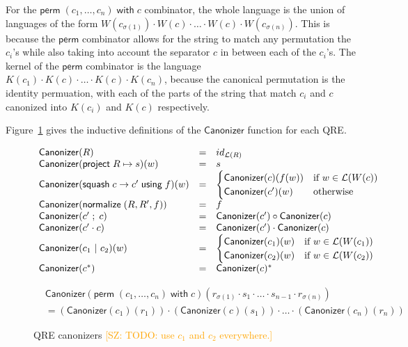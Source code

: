 \documentclass[acmsmall,review,anonymous]{acmart}
\newcommand{\FINISH}[3]{\ifdraft\textcolor{#1}{[#2: #3]}\fi}
\newcommand{\saz}[1]{\FINISH{orange}{SZ}{#1}}
\newcommand{\kw}[1]{\ensuremath{\mathsf{#1}}}
\newcommand{\project}[2]{\ensuremath{\kw{project} \; #1 \mapsto #2}}
\newcommand{\squash}[3]{\ensuremath{\kw{squash} \; #1 \rightarrow #2\; \kw{using} \; #3}}
\newcommand{\perm}[2]{\ensuremath{\kw{perm}\; (#1)\; \kw{with}\; #2}}
\newcommand{\normalize}[3]{\ensuremath{\kw{normalize} \; (#1, #2, #3)}}
\newcommand{\sep}{\ensuremath{\ | \ }}
\newcommand{\canonizer}{\ensuremath{\kw{Canonizer}}}
\begin{document}
For the $\perm{c_1, \ldots, c_n}{c}$ combinator, the whole language is the
union of languages of the form $W(c_{\sigma(1)}) \cdot W(c) \cdot \ldots \cdot
W(c) \cdot W(c_{\sigma(n)})$. This is because the \kw{perm}
combinator allows for the string to match any permutation the $c_i$'s while also
taking into account the separator $c$ in between each of the $c_i$'s. The kernel
of the \kw{perm} combinator is the language $K(c_1) \cdot K(c) \cdot
\ldots \cdot K(c) \cdot K(c_n)$, because the canonical permutation is the
identity permuation, with each of the parts of the string that match $c_i$
and $c$ canonized into $K(c_i)$ and $K(c)$ respectively.

Figure~\ref{fig:canonizers} gives the inductive definitions of the
$\canonizer{}$ function for each QRE.
\begin{figure}[t]
\begin{center}
\[
\begin{array}{l@\quad l @\quad l}
\canonizer(R) &=& id_{\mathcal{L}(R)} \\
\canonizer(\project{R}{s})(w) &=& s\\
\canonizer(\squash{c}{c'}{f})(w) &=&
\begin{cases}
\canonizer(c)(f(w)) & \text{if } w \in \mathcal{L}(W(c))\\
\canonizer(c')(w) & \text{otherwise}
\end{cases}\\
\canonizer(\normalize{R}{R'}{f}) &=& f\\
\canonizer(c' \; ; \; c) &=& \canonizer(c') \circ \canonizer(c)\\
\canonizer(c' \cdot c) &=& \canonizer(c') \cdot \canonizer(c)\\
\canonizer(c_1 \sep c_2)(w) &=&
\begin{cases}
\canonizer(c_1)(w) & \text{if } w \in \mathcal{L}(W(c_1))\\
\canonizer(c_2)(w) & \text{if } w \in \mathcal{L}(W(c_2))\\
\end{cases}\\
\canonizer(c^*) &=& \canonizer(c)^* \\
\end{array}
\]
\end{center}
\begin{align*}
&\canonizer(\perm{c_1, \ldots, c_n}{c})(r_{\sigma(1)}
\cdot s_1 \cdot \ldots \cdot s_{n-1} \cdot r_{\sigma(n)})\\
&= (\canonizer(c_1)(r_1)) \cdot (\canonizer(c)(s_1)) \cdot \ldots \cdot
(\canonizer(c_n)(r_n))
\end{align*}
\caption{QRE canonizers \saz{TODO: use $c_1$ and $c_2$ everywhere.}}
\label{fig:canonizers}
\end{figure}
\end{document}
